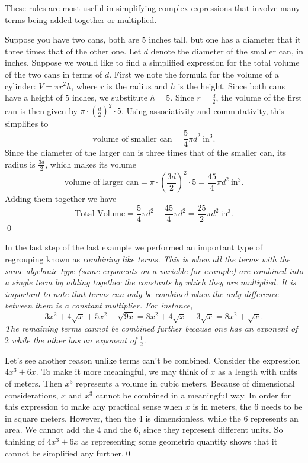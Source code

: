 These rules are most useful in simplifying complex expressions that involve many terms being added together or multiplied.

\begin{eg}
 Suppose you have two cans, both are $5$ inches tall, but one has a diameter that it three times that of the other one. Let $d$ denote the diameter of the smaller can, in inches. Suppose we would like to find a simplified expression for the total volume of the two cans in terms of $d$. First we note the formula for the volume of a cylinder: $V=\pi r^2h$, where $r$ is the radius and $h$ is the height. Since both cans have a height of $5$ inches, we substitute $h = 5$. Since $r= \frac{d}{2}$, the volume of the first can is then given by $\pi\cdot\left(\frac{d}{2}\right)^2\cdot 5$. Using associativity and commutativity, this simplifies to
\[
\mbox{volume of smaller can} = \frac{5}{4}\pi d^2\ \mbox{in}^3.
\]
Since the diameter of the larger can is three times that of the smaller can, its radius is $\frac{3d}{2}$, which makes its volume
\[
\mbox{volume of larger can} = \pi\cdot\left(\frac{3d}{2}\right)^2\cdot 5 = \frac{45}{4} \pi d^2\ \mbox{in}^3.
\]
Adding them together we have
\[
\mbox{Total Volume} = \frac{5}{4}\pi d^2 + \frac{45}{4}\pi d^2 = \frac{25}{2}\pi d^2\ \mbox{in}^3.
\]
\qed
\end{eg}

In the last step of the last example we performed an important type of regrouping known as \it{combining like terms}\normalfont. This is when all the terms with the same algebraic type (same exponents on a variable for example) are combined into a single term by adding together the constants by which they are multiplied. It is important to note that terms can only be combined when the only difference between them is a constant multiplier. For instance,
\[
3x^2 + 4\sqrt{x} + 5x^2 - \sqrt{9x} = 8x^2+4\sqrt{x}-3\sqrt{x} = 8x^2+\sqrt{x}.
\]
The remaining terms cannot be combined further because one has an exponent of $2$ while the other has an exponent of $\frac{1}{2}$.

\par

\begin{eg} Let's see another reason unlike terms can't be combined. Consider the expression $4x^3+ 6x$. To make it more meaningful, we may think of $x$ as a length with units of meters. Then $x^3$ represents a volume in cubic meters.  Because of dimensional considerations, $x$ and $x^3$ cannot be combined in a meaningful way. In order for this expression to make any practical sense when $x$ is in meters, the $6$ needs to be in square meters. However, then the $4$ is dimensionless, while the $6$ represents an area.  We cannot add the $4$ and the $6$, since they represent different units.   So thinking of $4x^3 + 6x$ as representing some geometric quantity shows that it cannot be simplified any further.\qed

\end{eg}

